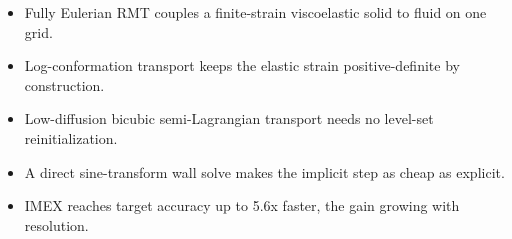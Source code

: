 \begin{itemize}
\item Fully Eulerian RMT couples a finite-strain viscoelastic solid to fluid on one grid.
\item Log-conformation transport keeps the elastic strain positive-definite by construction.
\item Low-diffusion bicubic semi-Lagrangian transport needs no level-set reinitialization.
\item A direct sine-transform wall solve makes the implicit step as cheap as explicit.
\item IMEX reaches target accuracy up to 5.6x faster, the gain growing with resolution.
\end{itemize}

